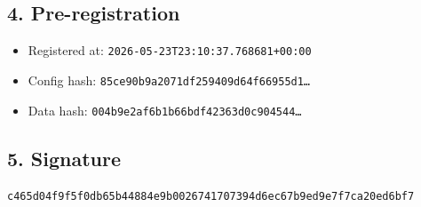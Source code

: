 \documentclass{article}
\begin{document}
\subsection*{4. Pre-registration}
\begin{itemize}
\item Registered at: \texttt{2026-05-23T23:10:37.768681+00:00}
\item Config hash: \texttt{85ce90b9a2071df259409d64f66955d1\dots}
\item Data hash: \texttt{004b9e2af6b1b66bdf42363d0c904544\dots}
\end{itemize}
\subsection*{5. Signature}
\texttt{c465d04f9f5f0db65b44884e9b0026741707394d6ec67b9ed9e7f7ca20ed6bf7}\\
\end{document}
